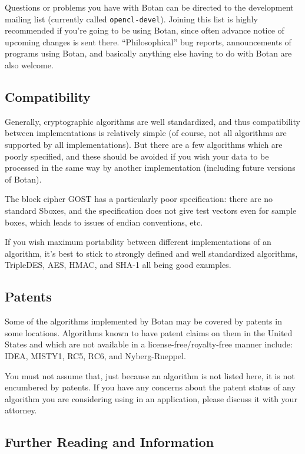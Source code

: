 \documentclass{article}
\begin{document}
Questions or problems you have with Botan can be directed to the development
mailing list (currently called \texttt{opencl-devel}). Joining this list is
highly recommended if you're going to be using Botan, since often advance
notice of upcoming changes is sent there. ``Philosophical'' bug reports,
announcements of programs using Botan, and basically anything else having to do
with Botan are also welcome.

\subsection{Compatibility}

Generally, cryptographic algorithms are well standardized, and thus
compatibility between implementations is relatively simple (of course, not all
algorithms are supported by all implementations). But there are a few
algorithms which are poorly specified, and these should be avoided if you wish
your data to be processed in the same way by another implementation (including
future versions of Botan).

The block cipher GOST has a particularly poor specification: there are no
standard Sboxes, and the specification does not give test vectors even for
sample boxes, which leads to issues of endian conventions, etc.

If you wish maximum portability between different implementations of an
algorithm, it's best to stick to strongly defined and well standardized
algorithms, TripleDES, AES, HMAC, and SHA-1 all being good examples.

\subsection{Patents}

Some of the algorithms implemented by Botan may be covered by patents in some
locations. Algorithms known to have patent claims on them in the United States
and which are not available in a license-free/royalty-free manner include:
IDEA, MISTY1, RC5, RC6, and Nyberg-Rueppel.

You must not assume that, just because an algorithm is not listed here, it is
not encumbered by patents. If you have any concerns about the patent status of
any algorithm you are considering using in an application, please discuss it
with your attorney.

\subsection{Further Reading and Information}
\end{document}
